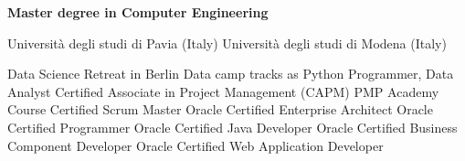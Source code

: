 %
%
%

\textbf{Master degree in Computer Engineering}
\begin{scholarship}
					{Università degli studi di Pavia (Italy)}
					{Università degli studi di Modena (Italy)}
\end{scholarship}
\begin{scholarship}
					{Data Science Retreat in Berlin}
					{Data camp tracks as Python Programmer, Data Analyst}
					{Certified Associate in Project Management (CAPM)}
					{PMP Academy Course}
					{Certified Scrum Master}
					{Oracle Certified Enterprise Architect}
					{Oracle Certified Programmer}
					{Oracle Certified Java Developer}
					{Oracle Certified Business Component Developer}
					{Oracle Certified Web Application Developer}
\end{scholarship}
					
					

